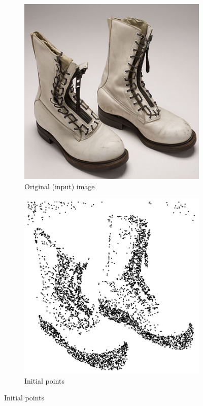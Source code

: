 \begin{figure}[!htb]
\begin{subfigure}[h]{0.4\linewidth}
\includegraphics[width=\linewidth]{images/boots_square_380.png}
\caption{Original (input) image}
\label{comparison-a}
\end{subfigure}
\hfill
\begin{subfigure}[h]{0.4\linewidth}
\includegraphics[width=\linewidth]{images/voronoi_shoes_distribution_stipples.png}
\caption{Initial points}
\end{subfigure}%


\end{figure}
